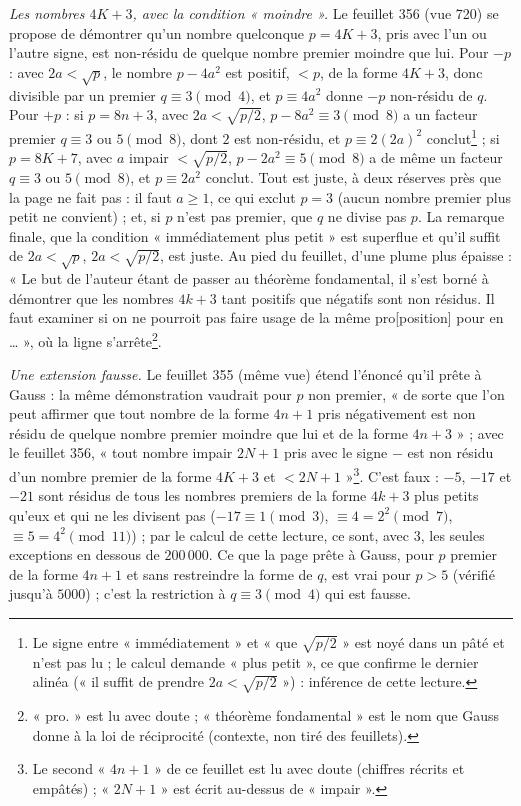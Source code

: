 \documentclass[11pt,a4paper]{article}
\begin{document}
\emph{Les nombres $4K+3$, avec la condition « moindre ».} Le feuillet 356 (vue 720) se propose de démontrer qu'un nombre quelconque $p=4K+3$, pris avec l'un ou l'autre signe, est non-résidu de quelque nombre premier moindre que lui. Pour $-p$ : avec $2a<\sqrt p$, le nombre $p-4a^2$ est positif, $<p$, de la forme $4K+3$, donc divisible par un premier $q\equiv3\pmod 4$, et $p\equiv 4a^2$ donne $-p$ non-résidu de $q$. Pour $+p$ : si $p=8n+3$, avec $2a<\sqrt{p/2}$, $p-8a^2\equiv 3\pmod 8$ a un facteur premier $q\equiv 3$ ou $5\pmod 8$, dont $2$ est non-résidu, et $p\equiv 2(2a)^2$ conclut\footnote{Le signe entre « immédiatement » et « que $\sqrt{p/2}$ » est noyé dans un pâté et n'est pas lu ; le calcul demande « plus petit », ce que confirme le dernier alinéa (« il suffit de prendre $2a<\sqrt{p/2}$ ») : inférence de cette lecture.} ; si $p=8K+7$, avec $a$ impair $<\sqrt{p/2}$, $p-2a^2\equiv 5\pmod 8$ a de même un facteur $q\equiv 3$ ou $5\pmod 8$, et $p\equiv 2a^2$ conclut. Tout est juste, à deux réserves près que la page ne fait pas : il faut $a\ge1$, ce qui exclut $p=3$ (aucun nombre premier plus petit ne convient) ; et, si $p$ n'est pas premier, que $q$ ne divise pas $p$. La remarque finale, que la condition « immédiatement plus petit » est superflue et qu'il suffit de $2a<\sqrt p$, $2a<\sqrt{p/2}$, est juste. Au pied du feuillet, d'une plume plus épaisse : « Le but de l'auteur étant de passer au théorème fondamental, il s'est borné à démontrer que les nombres $4k+3$ tant positifs que négatifs sont non résidus. Il faut examiner si on ne pourroit pas faire usage de la même pro[position] pour en … », où la ligne s'arrête\footnote{« pro. » est lu avec doute ; « théorème fondamental » est le nom que Gauss donne à la loi de réciprocité (contexte, non tiré des feuillets).}.

\emph{Une extension fausse.} Le feuillet 355 (même vue) étend l'énoncé qu'il prête à Gauss : la même démonstration vaudrait pour $p$ non premier, « de sorte que l'on peut affirmer que tout nombre de la forme $4n+1$ pris négativement est non résidu de quelque nombre premier moindre que lui et de la forme $4n+3$ » ; avec le feuillet 356, « tout nombre impair $2N+1$ pris avec le signe $-$ est non résidu d'un nombre premier de la forme $4K+3$ et $<2N+1$ »\footnote{Le second « $4n+1$ » de ce feuillet est lu avec doute (chiffres récrits et empâtés) ; « $2N+1$ » est écrit au-dessus de « impair ».}. C'est faux : $-5$, $-17$ et $-21$ sont résidus de tous les nombres premiers de la forme $4k+3$ plus petits qu'eux et qui ne les divisent pas ($-17\equiv 1\pmod 3$, $\equiv 4=2^2\pmod 7$, $\equiv 5=4^2\pmod{11}$) ; par le calcul de cette lecture, ce sont, avec $3$, les seules exceptions en dessous de $200\,000$. Ce que la page prête à Gauss, pour $p$ premier de la forme $4n+1$ et sans restreindre la forme de $q$, est vrai pour $p>5$ (vérifié jusqu'à $5000$) ; c'est la restriction à $q\equiv 3\pmod 4$ qui est fausse.
\end{document}
